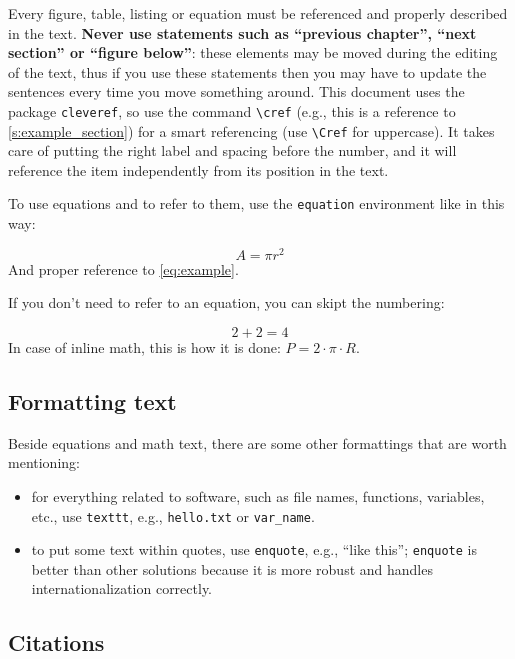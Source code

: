 Every figure, table, listing or equation must be referenced and properly described in the text.
\textbf{Never use statements such as \enquote{previous chapter}, \enquote{next section} or \enquote{figure below}}: these elements may be moved during the editing of the text, thus if you use these statements then you may have to update the sentences every time you move something around.
This document uses the package \texttt{cleveref}, so use the command \texttt{\textbackslash cref} (e.g., this is a reference to \cref{s:example_section}) for a smart referencing (use \texttt{\textbackslash Cref} for uppercase).
It takes care of putting the right label and spacing before the number, and it will reference the item independently from its position in the text.

To use equations and to refer to them, use the \texttt{equation} environment like in this way:

\begin{equation}
\label{eq:example}
A = \pi r^2
\end{equation}
%
And proper reference to \cref{eq:example}.

If you don't need to refer to an equation, you can skipt the numbering:

\[
2 + 2 = 4
\]
%
In case of inline math, this is how it is done: $P = 2 \cdot \pi \cdot R$.

\subsection{Formatting text}

Beside equations and math text, there are some other formattings that are worth mentioning:

\begin{itemize}
\item for everything related to software, such as file names, functions, variables, etc., use \texttt{texttt}, e.g., \texttt{hello.txt} or \texttt{var\_name}.
\item to put some text within quotes, use \texttt{enquote}, e.g., \enquote{like this}; \texttt{enquote} is better than other solutions because it is more robust and handles internationalization correctly.
\end{itemize}

\subsection{Citations}

